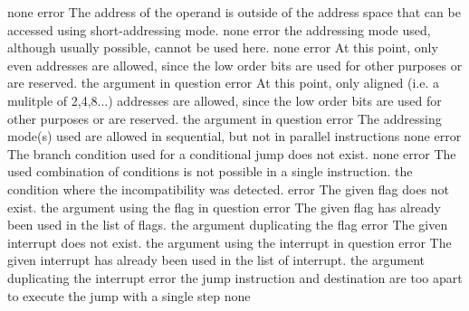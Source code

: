 \documentclass[12pt,twoside]{report}
\begin{document}
\begin{description}
               {none}
               {error}
               {The address of the operand is outside of the address space
                that can be accessed using short-addressing mode.}
               {none}
               {error}
               {the addressing mode used, although usually possible,
                cannot be used here.}
               {none}
               {error}
               {At this point, only even addresses are allowed, since the
                low order bits are used for other purposes or are reserved.}
               {the argument in question}
               {error}
               {At this point, only aligned (i.e. a mulitple of 2,4,8...) addresses
                are allowed, since the low order bits are used for other purposes
                or are reserved.}
               {the argument in question}
               {error}
               {The addressing mode(s) used are allowed in sequential,
                but not in parallel instructions}
               {none}
               {error}
               {The branch condition used for a conditional jump does not
                exist.}
               {none}
               {error}
               {The used combination of conditions is not possible
                in a single instruction.}
               {the condition where the incompatibility was detected.}
               {error}
               {The given flag does not exist.}
               {the argument using the flag in question}
               {error}
               {The given flag has already been used in the list of flags.}
               {the argument duplicating the flag}
               {error}
               {The given interrupt does not exist.}
               {the argument using the interrupt in question}
               {error}
               {The given interrupt has already been used in the list of interrupt.}
               {the argument duplicating the interrupt}
               {error}
               {the jump instruction and destination are too apart to
                execute the jump with a single step}
               {none}

\end{description}
\end{document}
